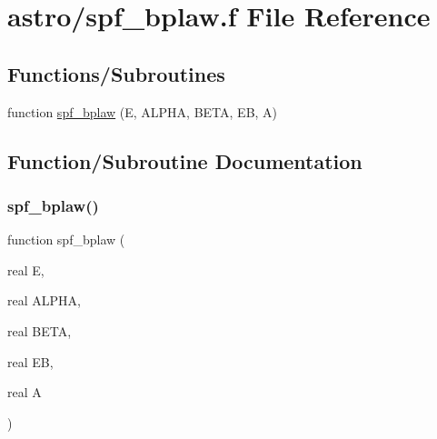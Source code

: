 \hypertarget{spf__bplaw_8f}{}\section{astro/spf\+\_\+bplaw.f File Reference}
\label{spf__bplaw_8f}
\subsection*{Functions/\+Subroutines}
\begin{DoxyCompactItemize}
\item 
function \hyperlink{spf__bplaw_8f_abb87a51d8859ba36eaea13468a17d097}{spf\+\_\+bplaw} (E, A\+L\+P\+HA, B\+E\+TA, EB, A)
\end{DoxyCompactItemize}


\subsection{Function/\+Subroutine Documentation}
\mbox{\label{spf__bplaw_8f_abb87a51d8859ba36eaea13468a17d097}} 
\subsubsection{\texorpdfstring{spf\+\_\+bplaw()}{spf\_bplaw()}}
{\footnotesize\ttfamily function spf\+\_\+bplaw (\begin{DoxyParamCaption}\item[{real}]{E,  }\item[{real}]{A\+L\+P\+HA,  }\item[{real}]{B\+E\+TA,  }\item[{real}]{EB,  }\item[{real}]{A }\end{DoxyParamCaption})}

